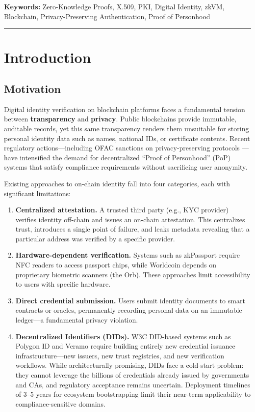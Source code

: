 \documentclass[11pt, a4paper]{article}
\begin{document}
\noindent\textbf{Keywords:} Zero-Knowledge Proofs, X.509, PKI, Digital Identity, zkVM,
Blockchain, Privacy-Preserving Authentication, Proof of Personhood

\vspace{1em}\hrule\vspace{1em}


\section{Introduction}\label{introduction}

\subsection{Motivation}\label{motivation}

Digital identity verification on blockchain platforms faces a
fundamental tension between \textbf{transparency} and \textbf{privacy}.
Public blockchains provide immutable, auditable records, yet this same
transparency renders them unsuitable for storing personal identity data
such as names, national IDs, or certificate contents. Recent regulatory
actions---including OFAC sanctions on privacy-preserving protocols
\cite{ref1}---have intensified the demand for decentralized ``Proof of
Personhood'' (PoP) systems that satisfy compliance requirements without
sacrificing user anonymity.

Existing approaches to on-chain identity fall into four categories,
each with significant limitations:

\begin{enumerate}
\def\labelenumi{\arabic{enumi}.}
\item
  \textbf{Centralized attestation.} A trusted third party (e.g., KYC
  provider) verifies identity off-chain and issues an on-chain
  attestation. This centralizes trust, introduces a single point of
  failure, and leaks metadata revealing that a particular address was
  verified by a specific provider.
\item
  \textbf{Hardware-dependent verification.} Systems such as zkPassport
  \cite{ref2} require NFC readers to access passport chips, while Worldcoin
  \cite{ref3} depends on proprietary biometric scanners (the Orb). These
  approaches limit accessibility to users with specific hardware.
\item
  \textbf{Direct credential submission.} Users submit identity documents
  to smart contracts or oracles, permanently recording personal data on
  an immutable ledger---a fundamental privacy violation.
\item
  \textbf{Decentralized Identifiers (DIDs).} W3C DID-based systems such
  as Polygon ID and Veramo require building entirely new credential
  issuance infrastructure---new issuers, new trust registries, and new
  verification workflows. While architecturally promising, DIDs face a
  cold-start problem: they cannot leverage the billions of credentials
  already issued by governments and CAs, and regulatory acceptance
  remains uncertain. Deployment timelines of 3--5 years for ecosystem
  bootstrapping limit their near-term applicability to
  compliance-sensitive domains.
\end{enumerate}
\end{document}
